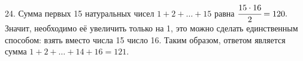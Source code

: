 24. Сумма первых 15 натуральных чисел $1+2+\ldots+15$ равна $\cfrac{15\cdot16}{2}=120.$ Значит, необходимо её увеличить только на 1, это можно сделать единственным способом: взять вместо числа 15 число 16. Таким образом, ответом является сумма $1+2+\ldots+14+16=121.$\\
